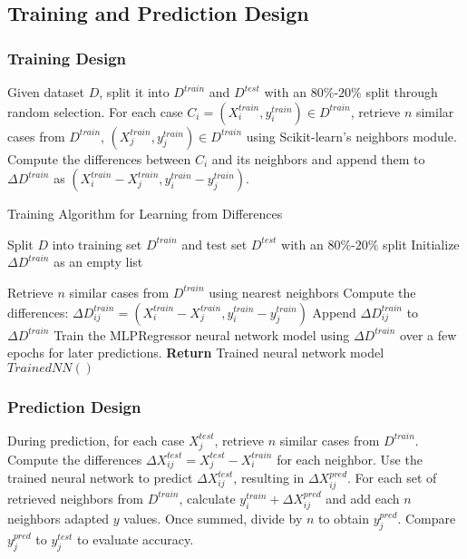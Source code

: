 \documentclass[a4paper, 12pt]{report}
\begin{document}
\subsection{Training and Prediction Design}
\subsubsection{Training Design}
Given dataset $D$, split it into $D^{train}$ and $D^{test}$ with an $80\%$-$20\%$ split through random selection. 
For each case $C_i = (X^{train}_i, y^{train}_i) \in D^{train}$, retrieve $n$ similar cases from $D^{train}$, $(X^{train}_j, y^{train}_j) \in D^{train}$ 
using Scikit-learn's neighbors module. Compute the differences between $C_i$ and its neighbors and append them to $\Delta D^{train}$ as $(X^{train}_i-X^{train}_j, y^{train}_i-y^{train}_j)$.

\begin{algorithm}
    \caption{Training Algorithm for Learning from Differences}
    \label{alg:learning_from_differences_train}
    \begin{algorithmic}[1]
        \State Split $D$ into training set $D^{train}$ and test set $D^{test}$ with an $80\%$-$20\%$ split
        \State Initialize $\Delta D^{train}$ as an empty list
        
            \State Retrieve $n$ similar cases from $D^{train}$ using nearest neighbors
                \State Compute the differences: $\Delta D^{train}_{ij} = (X^{train}_i - X^{train}_j, y^{train}_i - y^{train}_j)$
                \State Append $\Delta D^{train}_{ij}$ to $\Delta D^{train}$
            \EndFor
        \EndFor
        \State Train the MLPRegressor neural network model using $\Delta D^{train}$ over a few epochs for later predictions.
        \State \textbf{Return} Trained neural network model $Trained NN()$
    \end{algorithmic}
\end{algorithm}

\subsubsection{Prediction Design}
During prediction, for each case $X^{test}_j$, retrieve $n$ similar cases from $D^{train}$. Compute the differences $\Delta X^{test}_{ij} = X^{test}_j - X^{train}_i$ for each neighbor. 
Use the trained neural network to predict $\Delta X^{test}_{ij}$, resulting in $\Delta X^{pred}_{ij}$. 
For each set of retrieved neighbors from $D^{train}$, calculate $y^{train}_i + \Delta X^{pred}_{ij}$ and add each $n$ neighbors adapted $y$ values. 
Once summed, divide by $n$ to obtain $y^{pred}_j$. Compare $y^{pred}_j$ to $y^{test}_j$ to evaluate accuracy.
\end{document}
